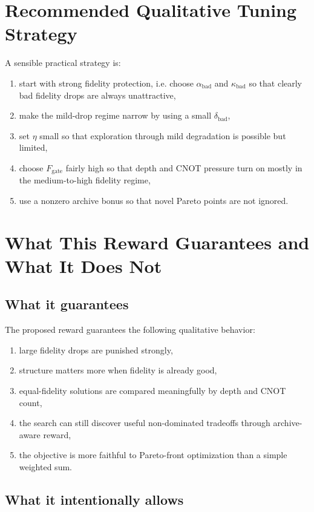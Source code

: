 \documentclass[11pt]{article}
\begin{document}
\section{Recommended Qualitative Tuning Strategy}

A sensible practical strategy is:
\begin{enumerate}[label=(\arabic*)]
    \item start with strong fidelity protection, i.e. choose $\alpha_{\mathrm{bad}}$ and $\kappa_{\mathrm{bad}}$ so that clearly bad fidelity drops are always unattractive,
    \item make the mild-drop regime narrow by using a small $\delta_{\mathrm{bad}}$,
    \item set $\eta$ small so that exploration through mild degradation is possible but limited,
    \item choose $F_{\mathrm{gate}}$ fairly high so that depth and CNOT pressure turn on mostly in the medium-to-high fidelity regime,
    \item use a nonzero archive bonus so that novel Pareto points are not ignored.
\end{enumerate}

\section{What This Reward Guarantees and What It Does Not}

\subsection{What it guarantees}

The proposed reward guarantees the following qualitative behavior:
\begin{enumerate}[label=(\roman*)]
    \item large fidelity drops are punished strongly,
    \item structure matters more when fidelity is already good,
    \item equal-fidelity solutions are compared meaningfully by depth and CNOT count,
    \item the search can still discover useful non-dominated tradeoffs through archive-aware reward,
    \item the objective is more faithful to Pareto-front optimization than a simple weighted sum.
\end{enumerate}

\subsection{What it intentionally allows}
\end{document}
